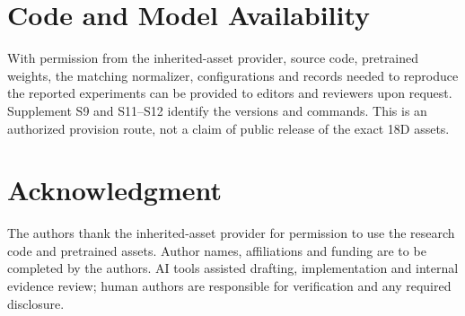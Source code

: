 \documentclass[conference]{IEEEtran}
\begin{document}
\section{Code and Model Availability}

With permission from the inherited-asset provider, source code, pretrained weights, the matching normalizer, configurations and records needed to reproduce the reported experiments can be provided to editors and reviewers upon request. Supplement S9 and S11--S12 identify the versions and commands. This is an authorized provision route, not a claim of public release of the exact 18D assets.

\section*{Acknowledgment}

The authors thank the inherited-asset provider for permission to use the research code and pretrained assets. Author names, affiliations and funding are to be completed by the authors. AI tools assisted drafting, implementation and internal evidence review; human authors are responsible for verification and any required disclosure.
\end{document}
